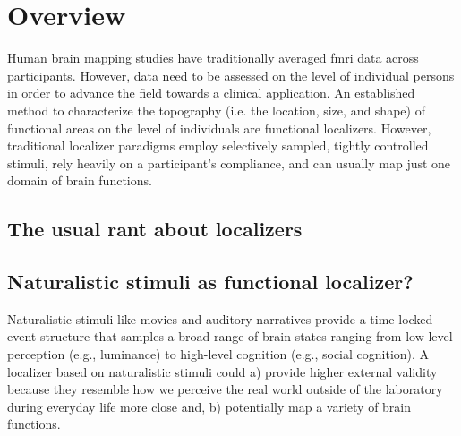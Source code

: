 
\section{Overview}




Human brain mapping studies have traditionally averaged \ac{fmri} data across
participants.
%
However, data need to be assessed on the level of individual persons in order to
advance the field towards a clinical application.
An established method to characterize the topography (i.e. the location, size,
and shape) of functional areas on the level of individuals are functional
localizers.
However, traditional localizer paradigms employ selectively sampled, tightly
controlled stimuli, rely heavily on a participant's compliance, and can usually
map just one domain of brain functions.


\subsection{The usual rant about localizers}





\subsection{Naturalistic stimuli as functional localizer?}


Naturalistic stimuli like movies and auditory narratives \citep[cf.][for
reviews]{jaaskelainen2021movies, jaaskelainen2020neural} provide a time-locked
event structure that samples a broad range of brain states ranging from
low-level perception (e.g., luminance) to high-level cognition (e.g., social
cognition).
%
A localizer based on naturalistic stimuli could
%
a) provide higher external validity because they resemble how we perceive the
real world outside of the laboratory during everyday life more close and,
%
b) potentially map a variety of brain functions.

